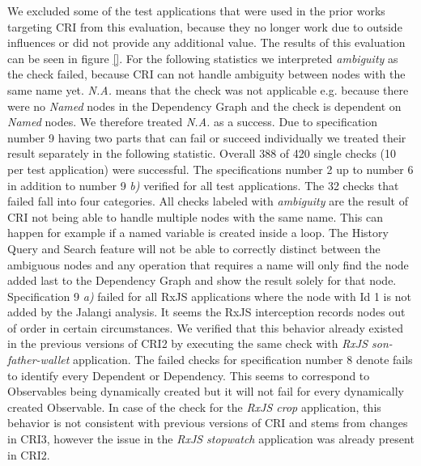 We excluded some of the test applications that were used in the prior works targeting CRI from this evaluation, because they no longer work due to outside influences or did not provide any additional value. The results of this evaluation can be seen in figure \ref{}. For the following statistics we interpreted \emph{ambiguity} as the check failed, because CRI can not handle ambiguity between nodes with the same name yet. \emph{N.A.} means that the check was not applicable e.g. because there were no \emph{Named} nodes in the Dependency Graph and the check is dependent on \emph{Named} nodes. We therefore treated \emph{N.A.} as a success. Due to specification number 9 having two parts that can fail or succeed individually we treated their result separately in the following statistic. Overall 388 of 420 single checks (10 per test application) were successful. The specifications number 2 up to number 6 in addition to number 9 \emph{b)} verified for all test applications. The 32 checks that failed fall into four categories. All checks labeled with \emph{ambiguity} are the result of CRI not being able to handle multiple nodes with the same name. This can happen for example if a named variable is created inside a loop. The History Query and Search feature will not be able to correctly distinct between the ambiguous nodes and any operation that requires a name will only find the node added last to the Dependency Graph and show the result solely for that node. Specification 9 \emph{a)} failed for all RxJS applications where the node with Id 1 is not added by the Jalangi analysis. It seems the RxJS interception records nodes out of order in certain circumstances. We verified that this behavior already existed in the previous versions of CRI2 by executing the same check with \emph{RxJS son-father-wallet} application. The failed checks for specification number 8 denote fails to identify every Dependent or Dependency. This seems to correspond to Observables being dynamically created but it will not fail for every dynamically created Observable. In case of the check for the \emph{RxJS crop} application, this behavior is not consistent with previous versions of CRI and stems from changes in CRI3, however the issue in the \emph{RxJS stopwatch} application was already present in CRI2.
